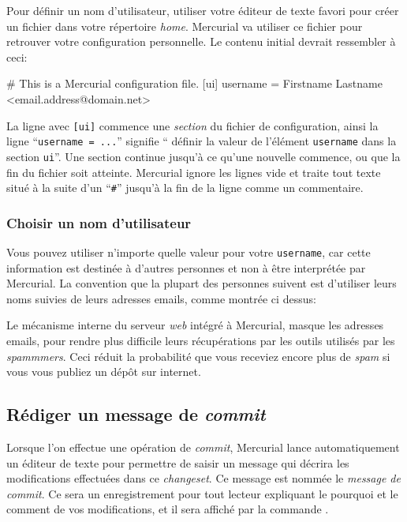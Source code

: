 Pour définir un nom d'utilisateur, utiliser votre éditeur de texte favori
pour créer un fichier  dans votre répertoire \textit{home}.
Mercurial va utiliser ce fichier pour retrouver votre configuration personnelle.
Le contenu initial devrait ressembler à ceci:
\begin{codesample2}
  # This is a Mercurial configuration file.
  [ui]
  username = Firstname Lastname <email.address@domain.net>
\end{codesample2}
La ligne avec \texttt{[ui]} commence une \emph{section} du fichier de
configuration, ainsi la ligne ``\texttt{username = ...}'' signifie ``
définir la valeur de l'élément \texttt{username} dans la section 
\texttt{ui}''. Une section continue jusqu'à ce qu'une nouvelle 
commence, ou que la fin du fichier soit atteinte. Mercurial ignore
les lignes vide et traite tout texte situé à la suite d'un  
``\texttt{\#}'' jusqu'à la fin de la ligne comme un commentaire.

\subsubsection{Choisir un nom d'utilisateur}

Vous pouvez utiliser n'importe quelle valeur pour votre \texttt{username},
car cette information est destinée à d'autres personnes et non à être
interprétée par Mercurial. La convention que la plupart des personnes
suivent est d'utiliser leurs noms suivies de leurs adresses emails,
comme montrée ci dessus:

\begin{note}
  Le mécanisme interne du serveur \textit{web} intégré à Mercurial,
  masque les adresses emails, pour rendre plus difficile leurs
  récupérations par les outils utilisés par les \textit{spammmers}.
  Ceci réduit la probabilité que vous receviez encore plus de 
  \textit{spam} si vous vous publiez un dépôt sur internet.
\end{note}

\subsection{Rédiger un message de \textit{commit}}

Lorsque l'on effectue une opération de \textit{commit}, Mercurial 
lance automatiquement un éditeur de texte pour permettre de saisir
un message qui décrira les modifications effectuées dans ce 
\textit{changeset}. Ce message est nommée le \emph{message de 
\textit{commit}}. Ce sera un enregistrement pour tout lecteur 
expliquant le pourquoi et le comment de vos modifications, et il sera
affiché par la commande .

